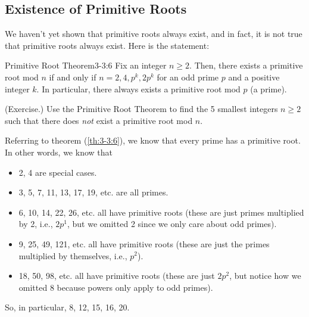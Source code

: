 \documentclass[letterpaper]{article}
\begin{document}
\subsection{Existence of Primitive Roots}
We haven't yet shown that primitive roots always exist, and in fact, it is not true that primitive roots always exist. Here is the statement:
\begin{theorem}{Primitive Root Theorem}{3-3:6}
    Fix an integer $n \geq 2$. Then, there exists a primitive root mod $n$ if and only if $n = 2, 4, p^k, 2p^k$ for an odd prime $p$ and a positive integer $k$. In particular, there always exists a primitive root mod $p$ (a prime). 
\end{theorem}

\begin{mdframed}
    (Exercise.) Use the Primitive Root Theorem to find the 5 smallest integers $n \geq 2$ such that there does \emph{not} exist a primitive root mod $n$.

    \begin{mdframed}
        Referring to theorem (\ref{th:3-3:6}), we know that every prime has a primitive root. In other words, we know that 
        \begin{itemize}
            \item 2, 4 are special cases. 
            \item 3, 5, 7, 11, 13, 17, 19, etc. are all primes.
            \item 6, 10, 14, 22, 26, etc. all have primitive roots (these are just primes multiplied by 2, i.e., $2p^1$, but we omitted 2 since we only care about odd primes). 
            \item 9, 25, 49, 121, etc. all have primitive roots (these are just the primes multiplied by themselves, i.e., $p^2$).
            \item 18, 50, 98, etc. all have primitive roots (these are just $2p^2$, but notice how we omitted 8 because powers only apply to odd primes). 
        \end{itemize} 
        So, in particular, 8, 12, 15, 16, 20.
    \end{mdframed}
\end{mdframed}
\end{document}
